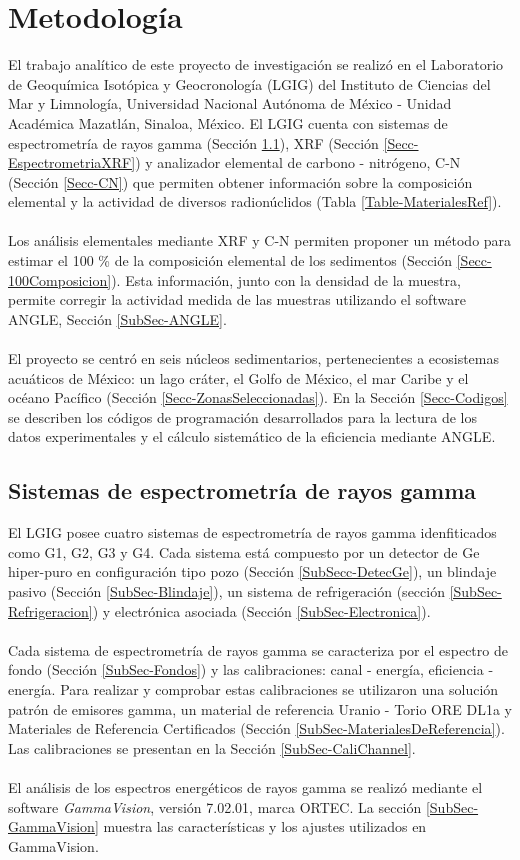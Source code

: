 \chapter{Metodología}
\lettrine{E}{}l trabajo analítico de este proyecto de investigación se realizó en el Laboratorio de Geoquímica Isotópica y Geocronología (LGIG) del Instituto de Ciencias del Mar y Limnología, Universidad Nacional Autónoma de México - Unidad Académica Mazatlán, Sinaloa, México. El LGIG cuenta con sistemas de espectrometría de rayos gamma (Sección \ref{Secc-EspectrometriaGamma}), XRF (Sección \ref{Secc-EspectrometriaXRF}) y analizador elemental de carbono - nitrógeno, C-N (Sección \ref{Secc-CN})  que permiten obtener información sobre la composición elemental y la actividad de diversos radionúclidos (Tabla \ref{Table-MaterialesRef}). 
\\
\\
Los análisis elementales mediante XRF y C-N permiten proponer un método para estimar el 100 \% de la composición elemental de los sedimentos (Sección \ref{Secc-100Composicion}). Esta información, junto con la densidad de la muestra, permite corregir la actividad medida de las muestras utilizando el software ANGLE, Sección \ref{SubSec-ANGLE}.
\\
\\
El proyecto se centró en seis núcleos sedimentarios, pertenecientes a ecosistemas acuáticos de México: un lago cráter, el Golfo de México, el mar Caribe y el océano Pacífico (Sección \ref{Secc-ZonasSeleccionadas}). En la Sección \ref{Secc-Codigos} se describen los códigos de programación desarrollados para la lectura de  los datos experimentales y el cálculo sistemático de la eficiencia mediante ANGLE.
	\section{Sistemas de espectrometría de rayos gamma}\label{Secc-EspectrometriaGamma}
El LGIG posee cuatro sistemas de espectrometría de rayos gamma idenfiticados como G1, G2, G3 y G4. Cada sistema está compuesto por un detector de Ge hiper-puro en configuración tipo pozo (Sección \ref{SubSecc-DetecGe}), un blindaje pasivo (Sección \ref{SubSec-Blindaje}), un sistema de refrigeración (sección \ref{SubSec-Refrigeracion}) y electrónica asociada (Sección \ref{SubSec-Electronica}).
\\ 
\\ 
Cada sistema de espectrometría de rayos gamma se caracteriza por el espectro de fondo (Sección \ref{SubSec-Fondos}) y las calibraciones: canal - energía, eficiencia - energía. Para realizar y comprobar estas calibraciones se utilizaron una solución patrón de emisores gamma, un material de referencia Uranio - Torio ORE DL1a y Materiales de Referencia Certificados (Sección \ref{SubSec-MaterialesDeReferencia}). Las calibraciones se presentan en la Sección \ref{SubSec-CaliChannel}. 
\\
\\
El análisis de los espectros energéticos de rayos gamma se realizó mediante el software \textit{GammaVision}, versión 7.02.01, marca ORTEC. La sección \ref{SubSec-GammaVision} muestra las características y los ajustes utilizados en GammaVision. 
